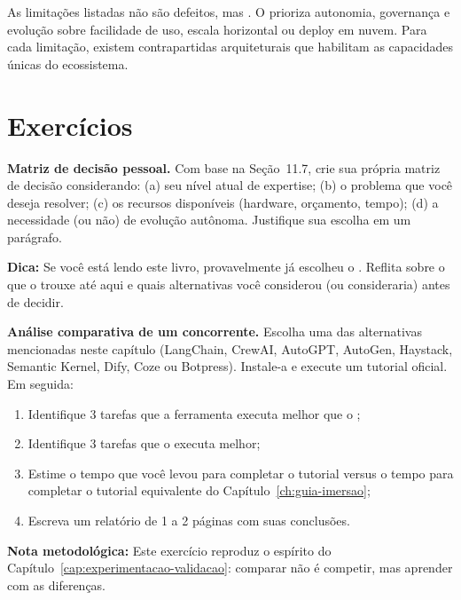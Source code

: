 \begin{observacao}
As limitações listadas não são defeitos, mas . O \opencodeeco{} prioriza autonomia, governança e evolução
sobre facilidade de uso, escala horizontal ou deploy em nuvem. Para
cada limitação, existem contrapartidas arquiteturais que habilitam as
capacidades únicas do ecossistema.
\end{observacao}

\section{Exercícios}
\label{sec:exercicios-comparacao}

\begin{exercicio}
\textbf{Matriz de decisão pessoal.} Com base na Seção~11.7, crie sua
própria matriz de decisão considerando: (a) seu nível atual de expertise;
(b) o problema que você deseja resolver; (c) os recursos disponíveis
(hardware, orçamento, tempo); (d) a necessidade (ou não) de evolução
autônoma. Justifique sua escolha em um parágrafo.

\textbf{Dica:} Se você está lendo este livro, provavelmente já escolheu o
\opencodeeco{}. Reflita sobre o que o trouxe até aqui e quais alternativas
você considerou (ou consideraria) antes de decidir.
\end{exercicio}

\begin{exercicio}
\textbf{Análise comparativa de um concorrente.} Escolha uma das alternativas
mencionadas neste capítulo (LangChain, CrewAI, AutoGPT, AutoGen, Haystack,
Semantic Kernel, Dify, Coze ou Botpress). Instale-a e execute um tutorial
oficial. Em seguida:

\begin{enumerate}
    \item Identifique 3 tarefas que a ferramenta executa melhor que o
          \opencodeeco{};
    \item Identifique 3 tarefas que o \opencodeeco{} executa melhor;
    \item Estime o tempo que você levou para completar o tutorial versus
          o tempo para completar o tutorial equivalente do
          Capítulo~\ref{ch:guia-imersao};
    \item Escreva um relatório de 1 a 2 páginas com suas conclusões.
\end{enumerate}

\textbf{Nota metodológica:} Este exercício reproduz o espírito do
Capítulo~\ref{cap:experimentacao-validacao}: comparar não é competir, mas
aprender com as diferenças.
\end{exercicio}

